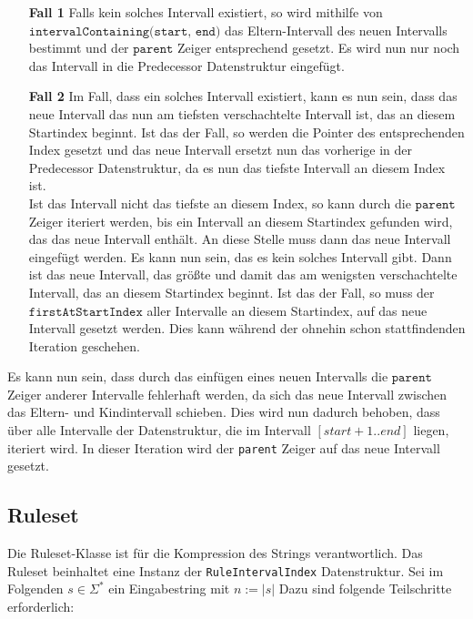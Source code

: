 \begin{itemize}[leftmargin=1.5cm]
    \item[\textbf{Fall 1}] Falls kein solches Intervall existiert, so wird mithilfe von\\
    $\texttt{intervalContaining(start, end)}$ das Eltern-Intervall des neuen Intervalls bestimmt und der $\texttt{parent}$ Zeiger entsprechend gesetzt.  Es wird nun nur noch das Intervall in die Predecessor Datenstruktur eingefügt.
    \item[\textbf{Fall 2}] Im Fall, dass ein solches Intervall existiert, kann es nun sein, dass das neue Intervall das nun am tiefsten verschachtelte Intervall ist, das an diesem Startindex beginnt. Ist das der Fall, so werden die Pointer des entsprechenden Index gesetzt und das neue Intervall ersetzt nun das vorherige in der Predecessor Datenstruktur, da es nun das tiefste Intervall an diesem Index ist.\\
    Ist das Intervall nicht das tiefste an diesem Index, so kann durch die $\texttt{parent}$ Zeiger iteriert werden, bis ein Intervall an diesem Startindex gefunden wird, das das neue Intervall enthält. An diese Stelle muss dann das neue Intervall eingefügt werden. Es kann nun sein, das es kein solches Intervall gibt. Dann ist das neue Intervall, das größte und damit das am wenigsten verschachtelte Intervall, das an diesem Startindex beginnt. Ist das der Fall, so muss der $\texttt{firstAtStartIndex}$ aller Intervalle an diesem Startindex, auf das neue Intervall gesetzt werden. Dies kann während der ohnehin schon stattfindenden Iteration geschehen. 
\end{itemize} 

Es kann nun sein, dass durch das einfügen eines neuen Intervalls die $\texttt{parent}$ Zeiger anderer Intervalle fehlerhaft werden, da sich das neue Intervall zwischen das Eltern- und
Kindintervall schieben. Dies wird nun dadurch behoben, dass über alle Intervalle der Datenstruktur, die im Intervall $[start+1..end]$ liegen, iteriert wird. In dieser Iteration wird der \texttt{parent} Zeiger auf das neue Intervall gesetzt. 


\subsection{Ruleset}

Die Ruleset-Klasse ist für die Kompression des Strings verantwortlich. Das Ruleset beinhaltet eine Instanz der \texttt{RuleIntervalIndex} Datenstruktur. Sei im Folgenden $s \in \Sigma^*$ ein Eingabestring mit $n := |s|$ Dazu sind folgende Teilschritte erforderlich:

